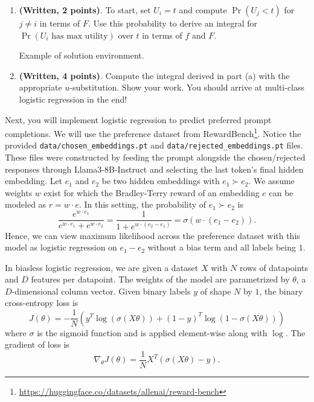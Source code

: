 \documentclass[
  letterpaper,
  numbers=noenddot,
  DIV=11]{scrreprt}
\theoremstyle{definition}
\theoremstyle{plain}
\theoremstyle{plain}
\theoremstyle{remark}
\DeclareRobustCommand{\href}[2]{#2\footnote{\url{#1}}}
\begin{document}
\begin{enumerate}
\def\labelenumi{(\alph{enumi})}
\item
  \textbf{(Written, 2 points)}. To start, set \(U_i=t\) and compute
  \(\Pr(U_j<t)\) for \(j\neq i\) in terms of \(F\). Use this probability
  to derive an integral for \(\Pr(U_i\,\,  \text{has max utility})\)
  over \(t\) in terms of \(f\) and \(F\).

  Example of solution environment.
\item
  \textbf{(Written, 4 points)}. Compute the integral derived in part (a)
  with the appropriate \(u\)-substitution. Show your work. You should
  arrive at multi-class logistic regression in the end!
\end{enumerate}

Next, you will implement logistic regression to predict preferred prompt
completions. We will use the preference dataset from
\href{https://huggingface.co/datasets/allenai/reward-bench}{RewardBench}.
Notice the provided \texttt{data/chosen\_embeddings.pt} and
\texttt{data/rejected\_embeddings.pt} files. These files were
constructed by feeding the prompt alongside the chosen/rejected
responses through Llama3-8B-Instruct and selecting the last token's
final hidden embedding. Let \(e_1\) and \(e_2\) be two hidden embeddings
with \(e_1\succ e_2\). We assume weights \(w\) exist for which the
Bradley-Terry reward of an embedding \(e\) can be modeled as
\(r=w\cdot e\). In this setting, the probability of \(e_1\succ e_2\) is
\[\frac{e^{w\cdot e_1}}{e^{w\cdot e_1}+e^{w\cdot e_2}}=\frac{1}{1+e^{w\cdot(e_2-e_1)}}=\sigma(w\cdot(e_1-e_2)).\]
Hence, we can view maximum likelihood across the preference dataset with
this model as logistic regression on \(e_1-e_2\) without a bias term and
all labels being \(1\).

In biasless logistic regression, we are given a dataset \(X\) with \(N\)
rows of datapoints and \(D\) features per datapoint. The weights of the
model are parametrized by \(\theta\), a \(D\)-dimensional column vector.
Given binary labels \(y\) of shape \(N\) by \(1\), the binary
cross-entropy loss is
\[J(\theta)=-\frac{1}{N}(y^T\log(\sigma(X\theta)) + (1-y)^T\log(1-\sigma(X\theta)))\]
where \(\sigma\) is the sigmoid function and is applied element-wise
along with \(\log\). The gradient of loss is
\[\nabla_\theta J(\theta)=\frac{1}{N}X^T(\sigma(X\theta)-y).\]
\end{document}
